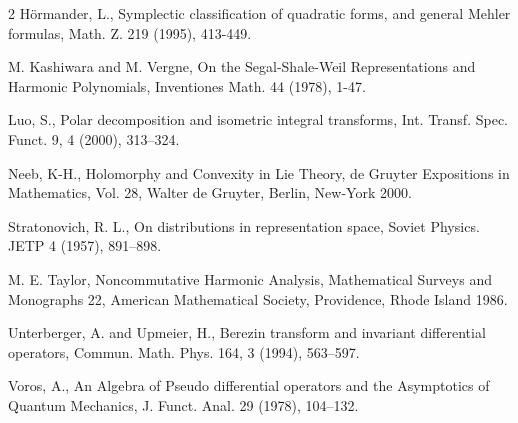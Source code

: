 \documentclass[12pt]{amsart}
\numberwithin{equation}{section}
\begin{document}
\begin{thebibliography}{2}
 H\"ormander, L., Symplectic classification of quadratic forms, and general Mehler formulas, Math. Z. 219 (1995), 413-449.

 M. Kashiwara and M. Vergne, On the Segal-Shale-Weil Representations and Harmonic Polynomials, Inventiones Math. 44 (1978), 1-47.

 Luo, S., Polar decomposition and isometric
integral transforms, Int. Transf. Spec. Funct. 9, 4 (2000),
313--324.

 Neeb, K-H., Holomorphy and Convexity in Lie Theory, de
Gruyter Expositions in Mathematics, Vol. 28, Walter de Gruyter,
Berlin, New-York 2000.

 Stratonovich, R. L., On distributions in representation space,
Soviet Physics. JETP 4 (1957), 891--898.

 M. E. Taylor, Noncommutative Harmonic Analysis, Mathematical
Surveys and Monographs 22, American Mathematical Society,
Providence, Rhode Island 1986.

 Unterberger, A. and Upmeier, H., Berezin transform
and invariant differential operators, Commun. Math. Phys. 164, 3
(1994), 563--597.

 Voros, A., An Algebra of Pseudo differential operators and the
Asymptotics of Quantum Mechanics, J. Funct. Anal. 29 (1978),
104--132.



\end{thebibliography}
\end{document}
